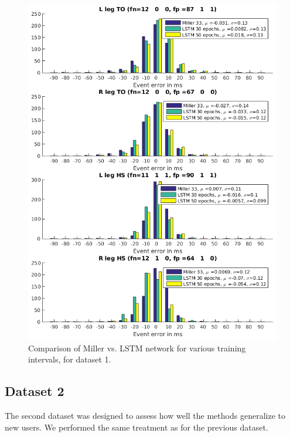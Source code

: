 \documentclass{acm_proc_article-sp}
\begin{document}
\begin{figure}[H]
 \centering
 \includegraphics[scale=.3]{./figures/Test1_1Train1_2Compare.png}
 \caption{Comparison of Miller vs. LSTM network for various training intervals, for dataset 1.}
 \label{fig:halfAndHalfTrials}
\end{figure}

\subsection{Dataset 2}
The second dataset was designed to assess how well the methods generalize to new users. We performed the same treatment as for the previous dataset. 
\end{document}
